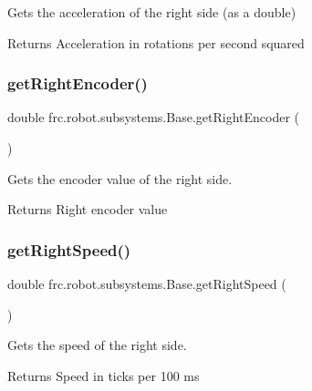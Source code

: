 Gets the acceleration of the right side (as a double) 

\begin{DoxyReturn}{Returns}
Acceleration in rotations per second squared 
\end{DoxyReturn}
\mbox{\label{classfrc_1_1robot_1_1subsystems_1_1_base_a86a18d2879f4d03144ff8f40a5fec8b3}} 
\subsubsection{\texorpdfstring{getRightEncoder()}{getRightEncoder()}}
{\footnotesize\ttfamily double frc.\+robot.\+subsystems.\+Base.\+get\+Right\+Encoder (\begin{DoxyParamCaption}{ }\end{DoxyParamCaption})\hspace{0.3cm}{\ttfamily [inline]}}



Gets the encoder value of the right side. 

\begin{DoxyReturn}{Returns}
Right encoder value 
\end{DoxyReturn}
\mbox{\label{classfrc_1_1robot_1_1subsystems_1_1_base_aff145d6bf9d8854b3d4fe312b40344d8}} 
\subsubsection{\texorpdfstring{getRightSpeed()}{getRightSpeed()}}
{\footnotesize\ttfamily double frc.\+robot.\+subsystems.\+Base.\+get\+Right\+Speed (\begin{DoxyParamCaption}{ }\end{DoxyParamCaption})\hspace{0.3cm}{\ttfamily [inline]}}



Gets the speed of the right side. 

\begin{DoxyReturn}{Returns}
Speed in ticks per 100 ms 
\end{DoxyReturn}
\mbox{\label{classfrc_1_1robot_1_1subsystems_1_1_base_a4d560fe022c6baab267770a9e671ad7d}} 
